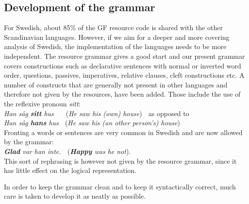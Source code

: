 \documentclass[submission]{eptcs} %
\begin{document}

\subsection{Development of the grammar}
For Swedish, about 85\% of the GF resource code is shared with the other Scandinavian
languages. %
However, if we aim for a deeper and more covering analysis of Swedish,
the implementation of the languages needs to be more independent.
The resource grammar gives a good start and our present grammar 
covers constructions such as declarative sentences with normal or inverted
word order, questions, passives, imperatives, relative clauses, cleft
constructions etc.
A number of constructs that are generally not present in other languages and therefore not given
by the resources, have been added. Those include the use of the reflexive pronoun \emph{sitt}: \\
\emph{Han såg \textbf{sitt} hus} $\; \; \; \;$ (\emph{He saw his (own) house}) $\;$
as opposed to \\
\emph{Han såg \textbf{hans} hus} $\;$ (\emph{He saw his (an other person's) house}) \\
Fronting a words or sentences are very common in Swedish and are now allowed by the grammar:\\
\emph{\textbf{Glad} var han inte.} $\;$ (\emph{\textbf{Happy} was he not}). \\
This sort of rephrasing is however not given by the resource grammar, since it
has little effect on the logical representation.

In order to keep the grammar clean and to keep it syntactically correct,
much care is taken to develop it as neatly as possible. 
\end{document}
